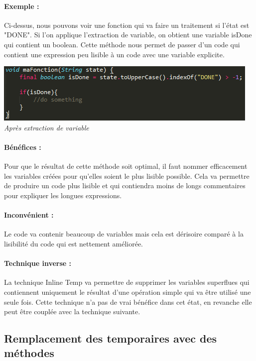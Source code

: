 \documentclass[a4paper,twoside,12pt,openright]{report}
\begin{document}
\paragraph{Exemple :}
Ci-dessus, nous pouvons voir une fonction qui va faire un traitement si l'état est "DONE".
Si l'on applique l'extraction de variable, on obtient une variable isDone qui contient un boolean. Cette méthode nous permet de passer d'un code qui contient une expression peu lisible à un code avec une variable explicite.

\begin{center}
\includegraphics[scale=1]{Image/Extraction_Variable2.png}\\
\itshape{Après extraction de variable}
\end{center}

\paragraph{Bénéfices :}
Pour que le résultat de cette méthode soit optimal, il faut nommer efficacement les variables créées pour  qu'elles soient le plus lisible possible. Cela va permettre de produire un code plus lisible et qui contiendra moins de longs commentaires pour expliquer les longues expressions.

\paragraph{Inconvénient :}
Le code va contenir beaucoup de variables mais cela est dérisoire comparé à la lisibilité du code qui est nettement améliorée.

\paragraph{Technique inverse :}
La technique Inline Temp va permettre de supprimer les variables superflues qui contiennent uniquement le résultat d'une opération simple qui va être utilisé une seule fois. Cette technique n'a pas de vrai bénéfice dans cet état, en revanche elle peut être couplée avec la technique suivante.\\

\subsection{Remplacement des temporaires avec des méthodes}
\end{document}
